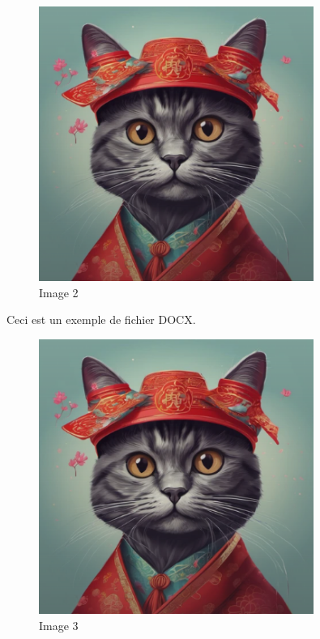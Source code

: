 \documentclass{article}%
\begin{document}
\begin{figure}[h!]%
\centering%
\includegraphics[width=0.8\textwidth]{source/image1.png}%
\caption{Image 2}%
\end{figure}

%
Ceci est un exemple de fichier DOCX.%


\begin{figure}[h!]%
\centering%
\includegraphics[width=0.8\textwidth]{source/image1.png}%
\caption{Image 3}%
\end{figure}

%
\end{document}

